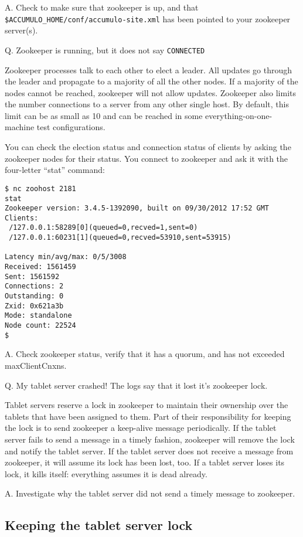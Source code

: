 A. Check to make sure that zookeeper is up, and that
\texttt{\$ACCUMULO\_HOME/conf/accumulo-site.xml} has been pointed to
your zookeeper server(s).

Q. Zookeeper is running, but it does not say \texttt{CONNECTED}

Zookeeper processes talk to each other to elect a leader.  All updates
go through the leader and propagate to a majority of all the other
nodes.  If a majority of the nodes cannot be reached, zookeeper will
not allow updates.  Zookeeper also limits the number connections to a
server from any other single host.  By default, this limit can be as small as 10 
and can be reached in some everything-on-one-machine test configurations.

You can check the election status and connection status of clients by
asking the zookeeper nodes for their status.  You connect to zookeeper
and ask it with the four-letter ``stat'' command:

\begingroup\fontsize{8pt}{8pt}\selectfont\begin{verbatim}
$ nc zoohost 2181
stat
Zookeeper version: 3.4.5-1392090, built on 09/30/2012 17:52 GMT
Clients:
 /127.0.0.1:58289[0](queued=0,recved=1,sent=0)
 /127.0.0.1:60231[1](queued=0,recved=53910,sent=53915)

Latency min/avg/max: 0/5/3008
Received: 1561459
Sent: 1561592
Connections: 2
Outstanding: 0
Zxid: 0x621a3b
Mode: standalone
Node count: 22524
$
\end{verbatim}\endgroup


A. Check zookeeper status, verify that it has a quorum, and has not exceeded maxClientCnxns.

Q. My tablet server crashed!  The logs say that it lost it's zookeeper lock.

Tablet servers reserve a lock in zookeeper to maintain their ownership
over the tablets that have been assigned to them.  Part of their
responsibility for keeping the lock is to send zookeeper a keep-alive
message periodically.  If the tablet server fails to send a message in
a timely fashion, zookeeper will remove the lock and notify the tablet
server.  If the tablet server does not receive a message from
zookeeper, it will assume its lock has been lost, too.  If a tablet
server loses its lock, it kills itself: everything assumes it is dead
already.

A. Investigate why the tablet server did not send a timely message to
zookeeper.

\subsection{Keeping the tablet server lock}

